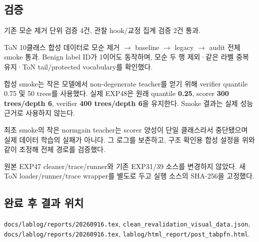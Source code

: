 \subsection{검증}
\par\noindent \textbullet\enspace 기존 모순 제거 단위 검증 4건, 관찰 hook/\allowbreak{}교정 집계 검증 2건 통과.


\par\noindent \textbullet\enspace ToN 10클래스 합성 데이터로 모순 제거 \ensuremath{\rightarrow} baseline \ensuremath{\rightarrow} legacy \ensuremath{\rightarrow} audit 전체 smoke 통과. Benign label ID가 1이어도 동작하며, 모순 두 행 제외·같은 라벨 중복 유지·ToN tail/\allowbreak{}protected vocabulary를 확인했다.


\par\noindent \textbullet\enspace 합성 smoke는 작은 모델에서 non-degenerate teacher를 얻기 위해 verifier quantile 0.75 및 50 trees를 사용했다. 실제 EXP48은 원래 quantile \textbf{0.25}, scorer \textbf{300 trees/\allowbreak{}depth 6}, verifier \textbf{400 trees/\allowbreak{}depth 6}을 유지한다. Smoke 결과는 실제 성능 근거로 사용하지 않는다.


\par\noindent \textbullet\enspace 최초 smoke의 작은 normgain teacher는 scorer 양성이 단일 클래스라서 중단됐으며 실제 데이터 학습의 실패가 아니다. 그 로그를 보존하고, 구조 확인용 합성 설정을 위와 같이 조정해 전체 경로를 검증했다.


\par\noindent \textbullet\enspace 원본 EXP47 cleaner/\allowbreak{}trace/\allowbreak{}runner와 기존 EXP31/\allowbreak{}39 소스를 변경하지 않았다. 새 ToN loader/\allowbreak{}runner/\allowbreak{}trace wrapper를 별도로 두고 실행 소스의 SHA-256을 고정했다.


\subsection{완료 후 결과 위치}
\texttt{docs/\allowbreak{}\allowbreak{}lab\allowbreak{}log/\allowbreak{}\allowbreak{}repo\allowbreak{}rts/\allowbreak{}\allowbreak{}2026\allowbreak{}0916.\allowbreak{}tex\allowbreak{}}, \texttt{clean\_\allowbreak{}\allowbreak{}re\allowbreak{}validati\allowbreak{}on\_\allowbreak{}\allowbreak{}visua\allowbreak{}l\_\allowbreak{}\allowbreak{}data.\allowbreak{}j\allowbreak{}son}, \texttt{docs/\allowbreak{}\allowbreak{}lab\allowbreak{}log/\allowbreak{}\allowbreak{}repo\allowbreak{}rts/\allowbreak{}\allowbreak{}2026\allowbreak{}0916.\allowbreak{}tex\allowbreak{}}, \texttt{lablog/\allowbreak{}\allowbreak{}h\allowbreak{}tml\_\allowbreak{}\allowbreak{}repo\allowbreak{}rt/\allowbreak{}\allowbreak{}post\_\allowbreak{}\allowbreak{}tabpfn.\allowbreak{}h\allowbreak{}tml}.

